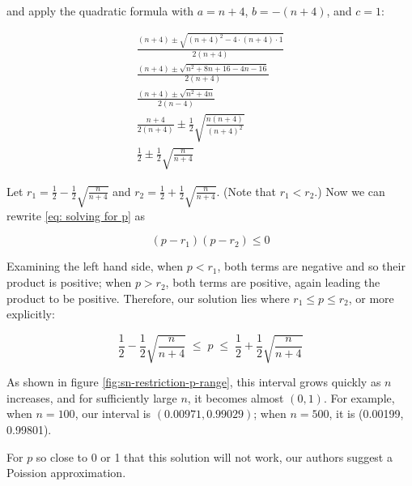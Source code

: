 and apply the quadratic formula with $a = n+4$, $b = -(n+4)$, and $c = 1$:

\begin{gather*}
  \frac{(n+4) \pm \sqrt{(n+4)^2 - 4 \cdot (n+4) \cdot 1}}{2(n+4)} \\
  \frac{(n+4) \pm \sqrt{n^2 + 8n + 16 - 4n - 16}}{2(n+4)} \\
  \frac{(n+4) \pm \sqrt{n^2 + 4n}}{2(n-4)} \\
  \frac{n+4}{2(n+4)} \pm \frac12 \sqrt{\frac{n(n+4)}{(n+4)^2}} \\
  \frac12 \pm \frac12 \sqrt{\frac{n}{n+4}}
\end{gather*}

Let $r_1 = \frac12 - \frac12 \sqrt{\frac{n}{n+4}}$ and $r_2 = \frac12 + \frac12
\sqrt{\frac{n}{n+4}}$. (Note that $r_1 < r_2$.) Now we can rewrite \eqref{eq:
solving for p} as

\begin{equation*}
  (p - r_1)(p - r_2) \leq 0
\end{equation*}

Examining the left hand side, when $p < r_1$, both terms are negative and so
their product is positive; when $p > r_2$, both terms are positive, again
leading the product to be positive. Therefore, our solution lies where $r_1
\leq p \leq r_2$, or more explicitly:

\begin{equation}
 \frac12 - \frac12 \sqrt{\frac{n}{n+4}} \; \leq \; p \; \leq \; \frac12 + \frac12 \sqrt{\frac{n}{n+4}}
\end{equation}

As shown in figure \ref{fig:sn-restriction-p-range}, this interval grows
quickly as $n$ increases, and for sufficiently large $n$, it becomes almost
$(0, 1)$. For example, when $n=100$, our interval is $(0.00971, 0.99029)$; when
$n=500$, it is (0.00199, 0.99801).

For $p$ so close to 0 or 1 that this solution will not work, our authors
suggest a Poission approximation.
